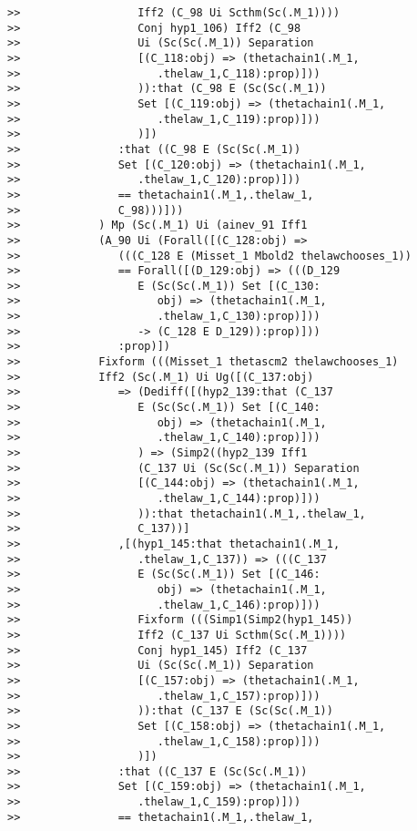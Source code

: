 \documentclass[12pt]{article}
\begin{document}
\begin{verbatim}
>>                  Iff2 (C_98 Ui Scthm(Sc(.M_1))))
>>                  Conj hyp1_106) Iff2 (C_98
>>                  Ui (Sc(Sc(.M_1)) Separation
>>                  [(C_118:obj) => (thetachain1(.M_1,
>>                     .thelaw_1,C_118):prop)]))
>>                  )):that (C_98 E (Sc(Sc(.M_1))
>>                  Set [(C_119:obj) => (thetachain1(.M_1,
>>                     .thelaw_1,C_119):prop)]))
>>                  )])
>>               :that ((C_98 E (Sc(Sc(.M_1))
>>               Set [(C_120:obj) => (thetachain1(.M_1,
>>                  .thelaw_1,C_120):prop)]))
>>               == thetachain1(.M_1,.thelaw_1,
>>               C_98)))]))
>>            ) Mp (Sc(.M_1) Ui (ainev_91 Iff1
>>            (A_90 Ui (Forall([(C_128:obj) =>
>>               (((C_128 E (Misset_1 Mbold2 thelawchooses_1))
>>               == Forall([(D_129:obj) => (((D_129
>>                  E (Sc(Sc(.M_1)) Set [(C_130:
>>                     obj) => (thetachain1(.M_1,
>>                     .thelaw_1,C_130):prop)]))
>>                  -> (C_128 E D_129)):prop)]))
>>               :prop)])
>>            Fixform (((Misset_1 thetascm2 thelawchooses_1)
>>            Iff2 (Sc(.M_1) Ui Ug([(C_137:obj)
>>               => (Dediff([(hyp2_139:that (C_137
>>                  E (Sc(Sc(.M_1)) Set [(C_140:
>>                     obj) => (thetachain1(.M_1,
>>                     .thelaw_1,C_140):prop)]))
>>                  ) => (Simp2((hyp2_139 Iff1
>>                  (C_137 Ui (Sc(Sc(.M_1)) Separation
>>                  [(C_144:obj) => (thetachain1(.M_1,
>>                     .thelaw_1,C_144):prop)]))
>>                  )):that thetachain1(.M_1,.thelaw_1,
>>                  C_137))]
>>               ,[(hyp1_145:that thetachain1(.M_1,
>>                  .thelaw_1,C_137)) => (((C_137
>>                  E (Sc(Sc(.M_1)) Set [(C_146:
>>                     obj) => (thetachain1(.M_1,
>>                     .thelaw_1,C_146):prop)]))
>>                  Fixform (((Simp1(Simp2(hyp1_145))
>>                  Iff2 (C_137 Ui Scthm(Sc(.M_1))))
>>                  Conj hyp1_145) Iff2 (C_137
>>                  Ui (Sc(Sc(.M_1)) Separation
>>                  [(C_157:obj) => (thetachain1(.M_1,
>>                     .thelaw_1,C_157):prop)]))
>>                  )):that (C_137 E (Sc(Sc(.M_1))
>>                  Set [(C_158:obj) => (thetachain1(.M_1,
>>                     .thelaw_1,C_158):prop)]))
>>                  )])
>>               :that ((C_137 E (Sc(Sc(.M_1))
>>               Set [(C_159:obj) => (thetachain1(.M_1,
>>                  .thelaw_1,C_159):prop)]))
>>               == thetachain1(.M_1,.thelaw_1,

\end{verbatim}
\end{document}
